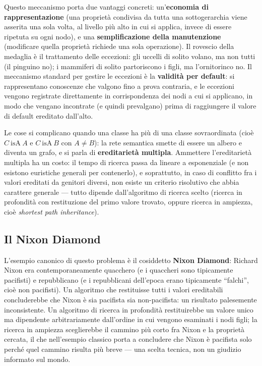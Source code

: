 \documentclass[11pt,a4paper]{report}
\begin{document}
Questo meccanismo porta due vantaggi concreti: un'\textbf{economia di rappresentazione} (una proprietà condivisa da tutta una sottogerarchia viene asserita una sola volta, al livello più alto in cui si applica, invece di essere ripetuta su ogni nodo), e una \textbf{semplificazione della manutenzione} (modificare quella proprietà richiede una sola operazione). Il rovescio della medaglia è il trattamento delle eccezioni: gli uccelli di solito volano, ma non tutti (il pinguino no); i mammiferi di solito partoriscono i figli, ma l'ornitorinco no. Il meccanismo standard per gestire le eccezioni è la \textbf{validità per default}: si rappresentano conoscenze che valgono fino a prova contraria, e le eccezioni vengono registrate direttamente in corrispondenza dei nodi a cui si applicano, in modo che vengano incontrate (e quindi prevalgano) prima di raggiungere il valore di default ereditato dall'alto.

Le cose si complicano quando una classe ha più di una classe sovraordinata (cioè $C\ \text{isA}\ A$ e $C\ \text{isA}\ B$ con $A \ne B$): la rete semantica smette di essere un albero e diventa un grafo, e si parla di \textbf{ereditarietà multipla}. Ammettere l'ereditarietà multipla ha un costo: il tempo di ricerca passa da lineare a esponenziale (e non esistono euristiche generali per contenerlo), e soprattutto, in caso di conflitto fra i valori ereditati da genitori diversi, non esiste un criterio risolutivo che abbia carattere generale --- tutto dipende dall'algoritmo di ricerca scelto (ricerca in profondità con restituzione del primo valore trovato, oppure ricerca in ampiezza, cioè \emph{shortest path inheritance}).

\subsection{Il Nixon Diamond}

L'esempio canonico di questo problema è il cosiddetto \textbf{Nixon Diamond}: Richard Nixon era contemporaneamente quacchero (e i quaccheri sono tipicamente pacifisti) e repubblicano (e i repubblicani dell'epoca erano tipicamente ``falchi'', cioè non pacifisti). Un algoritmo che restituisse tutti i valori ereditabili concluderebbe che Nixon è sia pacifista sia non-pacifista: un risultato palesemente inconsistente. Un algoritmo di ricerca in profondità restituirebbe un valore unico ma dipendente arbitrariamente dall'ordine in cui vengono esaminati i nodi figli; la ricerca in ampiezza sceglierebbe il cammino più corto fra Nixon e la proprietà cercata, il che nell'esempio classico porta a concludere che Nixon è pacifista solo perché quel cammino risulta più breve --- una scelta tecnica, non un giudizio informato sul mondo.
\end{document}
